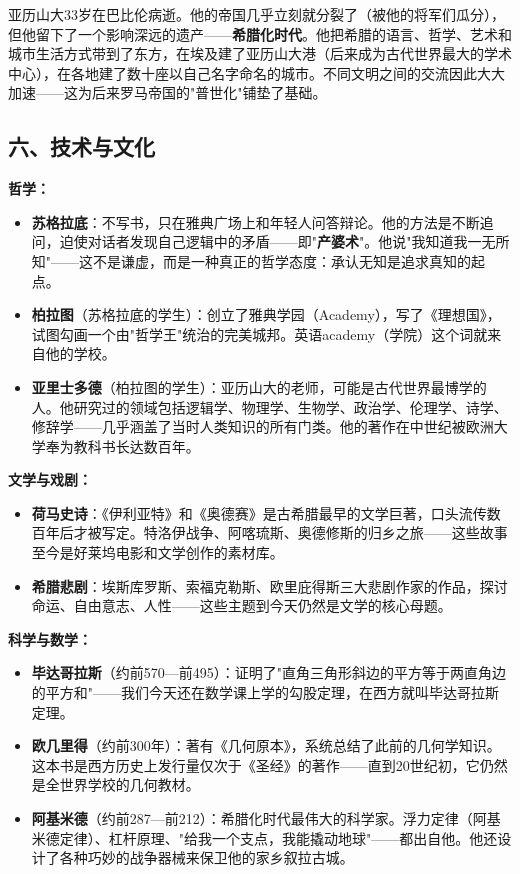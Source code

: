 \documentclass[a4paper,12pt]{ctexart}
\begin{document}
亚历山大33岁在巴比伦病逝。他的帝国几乎立刻就分裂了（被他的将军们瓜分），但他留下了一个影响深远的遗产——\textbf{希腊化时代}。他把希腊的语言、哲学、艺术和城市生活方式带到了东方，在埃及建了亚历山大港（后来成为古代世界最大的学术中心），在各地建了数十座以自己名字命名的城市。不同文明之间的交流因此大大加速——这为后来罗马帝国的"普世化"铺垫了基础。

\subsection*{六、技术与文化}

\textbf{哲学：}
\begin{itemize}
  \item \textbf{苏格拉底}：不写书，只在雅典广场上和年轻人问答辩论。他的方法是不断追问，迫使对话者发现自己逻辑中的矛盾——即"\textbf{产婆术}"。他说"我知道我一无所知"——这不是谦虚，而是一种真正的哲学态度：承认无知是追求真知的起点。
  \item \textbf{柏拉图}（苏格拉底的学生）：创立了雅典学园（Academy），写了《理想国》，试图勾画一个由"哲学王"统治的完美城邦。英语academy（学院）这个词就来自他的学校。
  \item \textbf{亚里士多德}（柏拉图的学生）：亚历山大的老师，可能是古代世界最博学的人。他研究过的领域包括逻辑学、物理学、生物学、政治学、伦理学、诗学、修辞学——几乎涵盖了当时人类知识的所有门类。他的著作在中世纪被欧洲大学奉为教科书长达数百年。
\end{itemize}

\textbf{文学与戏剧：}
\begin{itemize}
  \item \textbf{荷马史诗}：《伊利亚特》和《奥德赛》是古希腊最早的文学巨著，口头流传数百年后才被写定。特洛伊战争、阿喀琉斯、奥德修斯的归乡之旅——这些故事至今是好莱坞电影和文学创作的素材库。
  \item \textbf{希腊悲剧}：埃斯库罗斯、索福克勒斯、欧里庇得斯三大悲剧作家的作品，探讨命运、自由意志、人性——这些主题到今天仍然是文学的核心母题。
\end{itemize}

\textbf{科学与数学：}
\begin{itemize}
  \item \textbf{毕达哥拉斯}（约前570—前495）：证明了"直角三角形斜边的平方等于两直角边的平方和"——我们今天还在数学课上学的勾股定理，在西方就叫毕达哥拉斯定理。
  \item \textbf{欧几里得}（约前300年）：著有《几何原本》，系统总结了此前的几何学知识。这本书是西方历史上发行量仅次于《圣经》的著作——直到20世纪初，它仍然是全世界学校的几何教材。
  \item \textbf{阿基米德}（约前287—前212）：希腊化时代最伟大的科学家。浮力定律（阿基米德定律）、杠杆原理、"给我一个支点，我能撬动地球"——都出自他。他还设计了各种巧妙的战争器械来保卫他的家乡叙拉古城。
\end{itemize}
\end{document}

